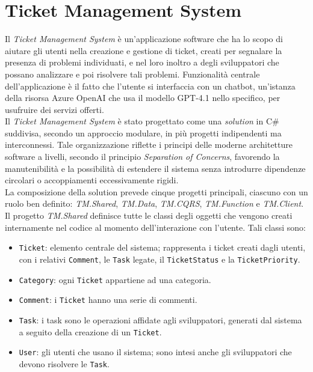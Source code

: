 \chapter{Ticket Management System}

Il \textit{Ticket Management System} è un'applicazione software che ha lo scopo di aiutare gli utenti nella creazione e gestione di ticket,
creati per segnalare la presenza di problemi individuati, e nel loro inoltro a degli sviluppatori che possano analizzare e poi risolvere
tali problemi. Funzionalità centrale dell'applicazione è il fatto che l'utente si interfaccia con un chatbot, un'istanza
della risorsa Azure OpenAI che usa il modello GPT-4.1 nello specifico, per usufruire dei servizi offerti.
\\
Il \textit{Ticket Management System} è stato progettato come una \textit{solution} in C\# suddivisa, secondo un approccio modulare,
in più progetti indipendenti ma interconnessi. Tale organizzazione riflette i principi delle moderne architetture software a livelli,
secondo il principio \textit{Separation of Concerns}, favorendo la manutenibilità e la possibilità di estendere il sistema
senza introdurre dipendenze circolari o accoppiamenti eccessivamente rigidi.
\\
La composizione della solution prevede cinque progetti principali, ciascuno con un ruolo ben definito: \textit{TM.Shared}, \textit{TM.Data},
\textit{TM.CQRS}, \textit{TM.Function} e \textit{TM.Client}.
\\
Il progetto \textit{TM.Shared} definisce tutte le classi degli oggetti che vengono creati internamente nel codice al momento dell'interazione
con l'utente. Tali classi sono:
\begin{itemize}
    \item \texttt{Ticket}: elemento centrale del sistema; rappresenta i ticket creati dagli utenti, con i relativi \texttt{Comment},
        le \texttt{Task} legate, il \texttt{TicketStatus} e la \texttt{TicketPriority}.
    \item \texttt{Category}: ogni \texttt{Ticket} appartiene ad una categoria.
    \item \texttt{Comment}: i \texttt{Ticket} hanno una serie di commenti.
    \item \texttt{Task}: i task sono le operazioni affidate agli sviluppatori, generati dal sistema a seguito della creazione
        di un \texttt{Ticket}.
    \item \texttt{User}: gli utenti che usano il sistema; sono intesi anche gli sviluppatori che devono risolvere le \texttt{Task}.
\end{itemize}

